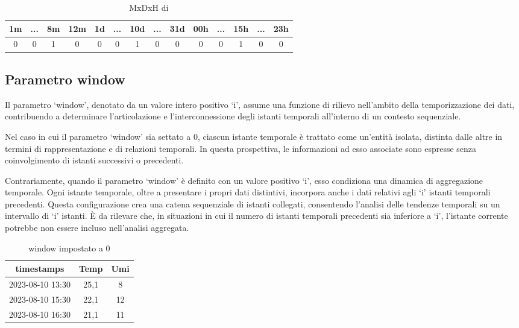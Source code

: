\documentclass[a4paper,10pt]{article}
\begin{document}
\begin{table}[h]\centering
  \begin{tabular}{|*{14}{c|}}
  
  \hline
  1m & ... & 8m & 12m & 1d & ... & 10d & ... & 31d & 00h & ... & 15h & ... & 23h\\
  \hline
  0 & 0 & 1 & 0 & 0 & 0 & 1 & 0 & 0 & 0 & 0 & 1 & 0 & 0\\
  \hline
  
  \end{tabular}
  
  \caption{MxDxH di  }
\end{table}

\subsection{Parametro window}

Il parametro `window', denotato da un valore intero positivo `i', assume una funzione di rilievo nell'ambito della temporizzazione dei dati, 
contribuendo a determinare l'articolazione e l'interconnessione degli istanti temporali all'interno di un contesto sequenziale.

Nel caso in cui il parametro `window' sia settato a 0, ciascun istante temporale è trattato come un'entità isolata, distinta dalle altre in termini 
di rappresentazione e di relazioni temporali. In questa prospettiva, le informazioni ad esso associate sono espresse senza coinvolgimento di 
istanti successivi o precedenti.

Contrariamente, quando il parametro `window' è definito con un valore positivo `i', esso condiziona una dinamica di aggregazione temporale. 
Ogni istante temporale, oltre a presentare i propri dati distintivi, incorpora anche i dati relativi agli `i' istanti temporali precedenti. 
Questa configurazione crea una catena sequenziale di istanti collegati, consentendo l'analisi delle tendenze temporali su un intervallo di `i' istanti. 
È da rilevare che, in situazioni in cui il numero di istanti temporali precedenti sia inferiore a `i', 
l'istante corrente potrebbe non essere incluso nell'analisi aggregata.



\begin{table}[h]
  \begin{tabular}{|c|c|c|}

    \hline
    timestamps & Temp & Umi\\
    \hline
    2023-08-10 13:30 & 25,1 & 8\\
    \hline
    2023-08-10 15:30 & 22,1 & 12\\
    \hline
    2023-08-10 16:30 & 21,1 & 11\\
    \hline
  
  \end{tabular}
  
  \caption{window impostato a 0}
\end{table}
\end{document}

